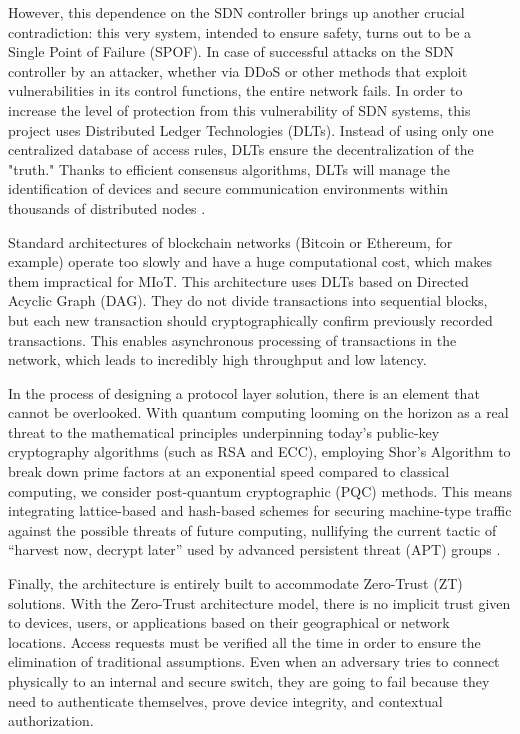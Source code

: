 \documentclass[12pt]{article}
\begin{document}
    However, this dependence on the SDN controller brings up another crucial contradiction: this very system, intended to ensure safety, turns out to be a Single Point of Failure (SPOF). In case of successful attacks on the SDN controller by an attacker, whether via DDoS or other methods that exploit vulnerabilities in its control functions, the entire network fails. In order to increase the level of protection from this vulnerability of SDN systems, this project uses Distributed Ledger Technologies (DLTs). Instead of using only one centralized database of access rules, DLTs ensure the decentralization of the "truth." Thanks to efficient consensus algorithms, DLTs will manage the identification of devices and secure communication environments within thousands of distributed nodes \cite{blockchain, Yang_2024_DAG}.

     Standard architectures of blockchain networks (Bitcoin or Ethereum, for example) operate too slowly and have a huge computational cost, which makes them impractical for MIoT. This architecture uses DLTs based on Directed Acyclic Graph (DAG). They do not divide transactions into sequential blocks, but each new transaction should cryptographically confirm previously recorded transactions. This enables asynchronous processing of transactions in the network, which leads to incredibly high throughput and low latency.

    In the process of designing a protocol layer solution, there is an element that cannot be overlooked. With quantum computing looming on the horizon as a real threat to the mathematical principles underpinning today’s public-key cryptography algorithms (such as RSA and ECC), employing Shor’s Algorithm to break down prime factors at an exponential speed compared to classical computing, we consider post-quantum cryptographic (PQC) methods. This means integrating lattice-based and hash-based schemes for securing machine-type traffic against the possible threats of future computing, nullifying the current tactic of “harvest now, decrypt later” used by advanced persistent threat (APT) groups \cite{post_quantummoura, ztiot}.

    Finally, the architecture is entirely built to accommodate Zero-Trust (ZT) solutions. With the Zero-Trust architecture model, there is no implicit trust given to devices, users, or applications based on their geographical or network locations. Access requests must be verified all the time in order to ensure the elimination of traditional assumptions. Even when an adversary tries to connect physically to an internal and secure switch, they are going to fail because they need to authenticate themselves, prove device integrity, and contextual authorization.
\end{document}
